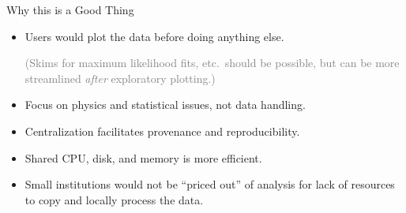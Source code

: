 \documentclass{beamer}
\begin{document}
\begin{frame}{Why this is a Good Thing}
\large
\vspace{0.5 cm}
\begin{itemize}\setlength{\itemsep}{0.5 cm}
\item Users would plot the data before doing anything else.

\vspace{0.2 cm}
\textcolor{gray}{\normalsize (Skims for maximum likelihood fits, etc.\ should be possible, but can be more streamlined {\it after} exploratory plotting.)}

\vspace{-0.2 cm}
\item Focus on physics and statistical issues, not data handling.
\item Centralization facilitates provenance and reproducibility.
\item Shared CPU, disk, and memory is more efficient.
\item Small institutions would not be ``priced out'' of analysis for lack of resources to copy and locally process the data.
\end{itemize}
\end{frame}
\end{document}
